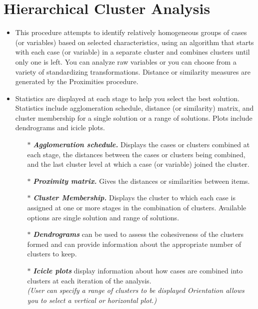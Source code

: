 

	
	\section{Hierarchical Cluster Analysis}
	\begin{itemize}
		\item 
	
	This procedure attempts to identify relatively homogeneous groups of cases (or variables) based on selected characteristics, using an algorithm that starts with each case (or variable) in a separate cluster and combines clusters until only one is left. You can analyze raw variables or you can choose from a variety of standardizing transformations. Distance or similarity measures are generated by the Proximities procedure. \item Statistics are displayed at each stage to help you select the best solution.  Statistics include agglomeration schedule, distance (or similarity) matrix, and cluster membership for a single solution or a range of solutions.  Plots include dendrograms and icicle plots.
	\begin{itemize}
		\item[$\ast$] 	\textbf{\textit{Agglomeration schedule.}} Displays the cases or clusters combined at each stage, the distances between the cases or clusters being combined, and the last cluster level at which a case (or variable) joined the cluster.
		\item[$\ast$]  	\textbf{\textit{Proximity matrix.}} Gives the distances or similarities between items.
		\item[$\ast$]  	\textbf{\textit{Cluster Membership.}} Displays the cluster to which each case is assigned at one or more stages in the combination of clusters. Available options are single solution and range of solutions.
		\item[$\ast$]  	\textbf{\textit{Dendrograms}} can be used to assess the cohesiveness of the clusters formed and can provide information about the appropriate number of clusters to keep.
		\item[$\ast$]  	\textbf{\textit{Icicle plots}} display information about how cases are combined into clusters at each iteration of the analysis. \\ \textit{(User can specify a range of clusters to be displayed Orientation allows you to select a vertical or horizontal plot.)}
	\end{itemize}
\end{itemize}
